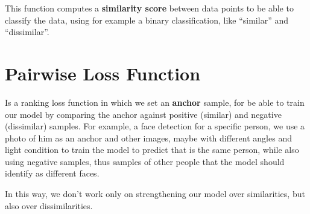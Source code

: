 \documentclass[oneside]{academica}
\begin{document}
This function computes a \textbf{similarity score} between data points to be able to classify the data, using for example a binary classification, like ``similar'' and ``dissimilar''.

\section{Pairwise Loss Function}

Is a ranking loss function in which we set an \textbf{anchor} sample, for be able to train our model by comparing the anchor against positive (similar) and negative (dissimilar) samples.
For example, a face detection for a specific person, we use a photo of him as an anchor and other images, maybe with different angles and light condition to train the model to predict that is the same person, while also using negative samples, thus samples of other people that the model should identify as different faces.

In this way, we don't work only on strengthening our model over similarities, but also over dissimilarities.
\end{document}
